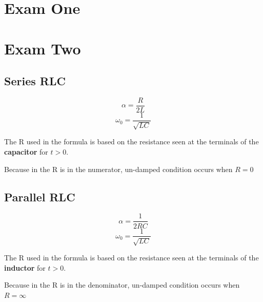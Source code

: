 \documentclass{article}
\begin{document}
\section*{Exam One}
\newpage
\section*{Exam Two}
\subsection*{Series RLC}
\begin{equation}
\alpha = \frac{R}{2L}
\end{equation}
\begin{equation}
\omega_0 = \frac{1}{\sqrt{LC}}
\end{equation}
\begin{center}
The R used in the formula is based on the resistance seen at the terminals of the \textbf{capacitor} for $t > 0$.
    
Because in the R is in the numerator, un-damped condition occurs when $R = 0$
\end{center}

\subsection*{Parallel RLC}
\begin{equation}
\alpha = \frac{1}{2RC}
\end{equation}
\begin{equation}
\omega_0 = \frac{1}{\sqrt{LC}}
\end{equation}
\begin{center}
The R used in the formula is based on the resistance seen at the terminals of the \textbf{inductor} for $t > 0$.

Because in the R is in the denominator, un-damped condition occurs when $R = \infty$
\end{center}
\end{document}
